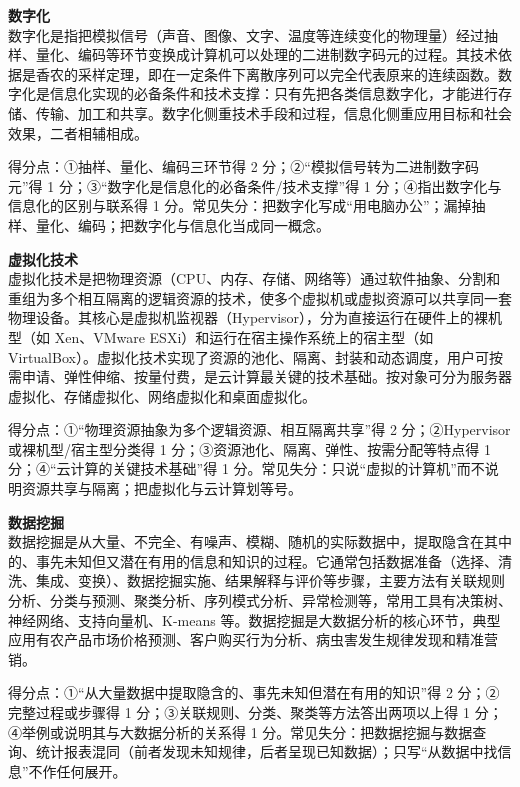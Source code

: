\documentclass[a4paper,11pt]{article}
\begin{document}


\q \textbf{数字化}\\
数字化是指把模拟信号（声音、图像、文字、温度等连续变化的物理量）经过抽样、量化、编码等环节变换成计算机可以处理的二进制数字码元的过程。其技术依据是香农的采样定理，即在一定条件下离散序列可以完全代表原来的连续函数。数字化是信息化实现的必备条件和技术支撑：只有先把各类信息数字化，才能进行存储、传输、加工和共享。数字化侧重技术手段和过程，信息化侧重应用目标和社会效果，二者相辅相成。
\begin{analysis}得分点：①抽样、量化、编码三环节得 2 分；②“模拟信号转为二进制数字码元”得 1 分；③“数字化是信息化的必备条件/技术支撑”得 1 分；④指出数字化与信息化的区别与联系得 1 分。常见失分：把数字化写成“用电脑办公”；漏掉抽样、量化、编码；把数字化与信息化当成同一概念。\end{analysis}

\q \textbf{虚拟化技术}\\
虚拟化技术是把物理资源（CPU、内存、存储、网络等）通过软件抽象、分割和重组为多个相互隔离的逻辑资源的技术，使多个虚拟机或虚拟资源可以共享同一套物理设备。其核心是虚拟机监视器（Hypervisor），分为直接运行在硬件上的裸机型（如 Xen、VMware ESXi）和运行在宿主操作系统上的宿主型（如 VirtualBox）。虚拟化技术实现了资源的池化、隔离、封装和动态调度，用户可按需申请、弹性伸缩、按量付费，是云计算最关键的技术基础。按对象可分为服务器虚拟化、存储虚拟化、网络虚拟化和桌面虚拟化。
\begin{analysis}得分点：①“物理资源抽象为多个逻辑资源、相互隔离共享”得 2 分；②Hypervisor 或裸机型/宿主型分类得 1 分；③资源池化、隔离、弹性、按需分配等特点得 1 分；④“云计算的关键技术基础”得 1 分。常见失分：只说“虚拟的计算机”而不说明资源共享与隔离；把虚拟化与云计算划等号。\end{analysis}

\q \textbf{数据挖掘}\\
数据挖掘是从大量、不完全、有噪声、模糊、随机的实际数据中，提取隐含在其中的、事先未知但又潜在有用的信息和知识的过程。它通常包括数据准备（选择、清洗、集成、变换）、数据挖掘实施、结果解释与评价等步骤，主要方法有关联规则分析、分类与预测、聚类分析、序列模式分析、异常检测等，常用工具有决策树、神经网络、支持向量机、K-means 等。数据挖掘是大数据分析的核心环节，典型应用有农产品市场价格预测、客户购买行为分析、病虫害发生规律发现和精准营销。
\begin{analysis}得分点：①“从大量数据中提取隐含的、事先未知但潜在有用的知识”得 2 分；②完整过程或步骤得 1 分；③关联规则、分类、聚类等方法答出两项以上得 1 分；④举例或说明其与大数据分析的关系得 1 分。常见失分：把数据挖掘与数据查询、统计报表混同（前者发现未知规律，后者呈现已知数据）；只写“从数据中找信息”不作任何展开。\end{analysis}
\end{document}
